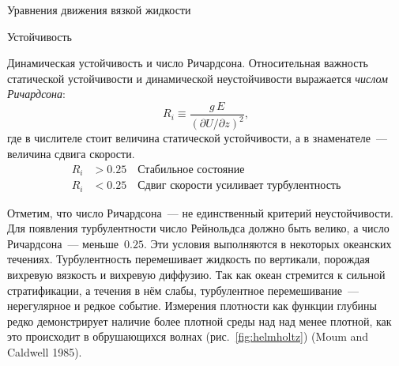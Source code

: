 \begin{chapter}{Уравнения движения вязкой жидкости}
\begin{section}{Устойчивость}
\begin{paragraph}{Динамическая устойчивость и число Ричардсона.}
Относительная важность статической устойчивости и динамической
неустойчивости выражается 
\emph{числом Ричардсона}:
\begin{equation}
 \boxed{R_i\equiv\frac{g\,E}{(\partial{U}/\partial{z})^2},}
\end{equation}
где в числителе стоит величина статической устойчивости, а в
знаменателе~--- величина сдвига скорости.
\begin{align*}
R_i &>0.25 \quad \text{Стабильное состояние} \\
R_i &<0.25 \quad \text{Сдвиг скорости усиливает турбулентность} 
\end{align*}
%

Отметим, что число Ричардсона~--- не единственный критерий
неустойчивости. Для появления турбулентности число Рейнольдса должно
быть велико, а число Ричардсона~--- меньше~$0.25$. Эти условия выполняются
в некоторых океанских течениях. Турбулентность перемешивает жидкость
по вертикали, порождая вихревую вязкость и вихревую диффузию. Так как
океан стремится к сильной стратификации, а течения в нём слабы,
турбулентное перемешивание~--- нерегулярное и редкое событие. Измерения
плотности как функции глубины редко демонстрирует наличие более
плотной среды над над менее плотной, как это происходит в обрушающихся
волнах (рис.~\ref{fig:helmholtz}) (Moum and Caldwell 1985).
%
\end{paragraph}


\end{section}
\end{chapter}
